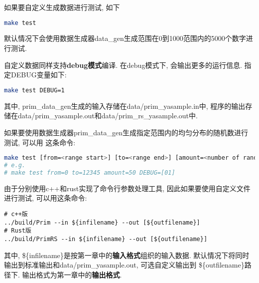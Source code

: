 如果要自定义生成数据进行测试, 如下
\begin{lstlisting}[language=bash]
make test
\end{lstlisting}
默认情况下会使用数据生成器data\_gen生成范围在0到1000范围内的5000个数字进行测试.\par

自定义数据同样支持\textbf{debug模式}编译. 在debug模式下, 会输出更多的运行信息.
指定DEBUG变量如下:
\begin{lstlisting}[language=bash]
make test DEBUG=1
\end{lstlisting}

其中, prim\_data\_gen生成的输入存储在data/prim\_yasample.in中,
程序的输出存储在data/prim\_yasample.out和data/prim\_rs\_yasample.out中. \par

如果要使用数据生成器prim\_data\_gen生成指定范围内的均匀分布的随机数进行测试, 可以用
这条命令:
\begin{lstlisting}[language=bash]
make test [from=<range start>] [to=<range end>] [amount=<number of random numbers>]
# e.g. 
# make test from=0 to=12345 amount=50 DEBUG=[01]
\end{lstlisting}

由于分别使用c++和rust实现了命令行参数处理工具, 因此如果要使用自定义文件进行测试,
可以用这条命令:
\begin{lstlisting}
# c++版
../build/Prim --in ${infilename} --out [${outfilename}]
# Rust版
../build/PrimRS --in ${infilename} --out [${outfilename}]
\end{lstlisting}
其中, \$\{infilename\}是按第一章中的\textbf{输入格式}组织的输入数据.
默认情况下将同时输出到标准输出和data/prim\_yasample.out, 可选自定义输出到
\$\{outfilename\}路径下. 输出格式为第一章中的\textbf{输出格式}.

